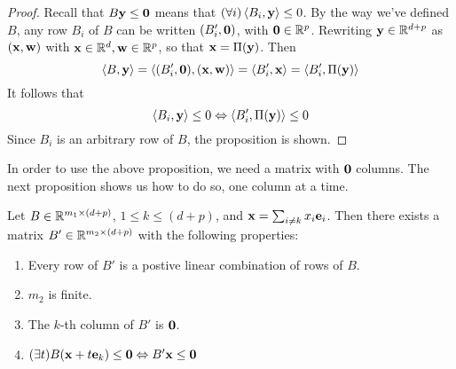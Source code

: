 \begin{proof}
  Recall that $B\mathbf{y} \leq \mathbf{0}$ means that $(\forall i)\left\langle B_i, \mathbf{y} \right\rangle \leq 0$.  By the way we've defined $B$, any row $B_i$ of $B$ can be written $(B'_i,\mathbf{0})$, with $\mathbf{0} \in \mathbb{R}^p$.  Rewriting $\mathbf{y}\in\mathbb{R}^{d+p}$ as $(\mathbf{x},\mathbf{w})$ with $\mathbf{x}\in\mathbb{R}^d,\mathbf{w}\in\mathbb{R}^p$, so that $\mathbf{x} = \Pi(\mathbf{y})$.  Then
  \[ \left\langle B, \mathbf{y} \right\rangle = \left\langle (B'_i,\mathbf{0}), (\mathbf{x},\mathbf{w}) \right\rangle = \left\langle B'_i, \mathbf{x} \right\rangle = \left\langle B'_i, \Pi(\mathbf{y}) \right\rangle \]
  It follows that
  \[ \left\langle B_i, \mathbf{y} \right\rangle \leq 0 \Leftrightarrow \left\langle B'_i, \Pi(\mathbf{y}) \right\rangle \leq 0 \]
  Since $B_i$ is an arbitrary row of $B$, the proposition is shown.
\end{proof}

In order to use the above proposition, we need a matrix with $\mathbf{0}$ columns.  The next proposition shows us how to do so, one column at a time.

\begin{Prop}{\label{prop:hconeproj}
Let $B \in \mathbb{R}^{m_1\times (d+p)}$, $1 \leq k \leq (d+p)$, and $\mathbf{x} = \sum_{i\neq k}x_i \mathbf{e}_i$.  Then there exists a matrix $B' \in \mathbb{R}^{m_2\times (d+p)}$ with the following properties:
  \begin{enumerate}
    \item Every row of $B'$ is a postive linear combination of rows of $B$.
    \item $m_2$ is finite.
    \item The $k$-th column of $B'$ is $\mathbf{0}$.
    \item \((\exists t)B(\mathbf{x} + t\mathbf{e}_k) \leq \mathbf{0} \Leftrightarrow B'\mathbf{x} \leq \mathbf{0}\)
  \end{enumerate}
}\end{Prop}
